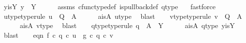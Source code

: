 \begin{isabellebody}
\ y{\isacharunderscore}{\kern0pt}is{\isacharunderscore}{\kern0pt}Y{\isacharcolon}{\kern0pt}\ {\isachardoublequoteopen}y\ {\isacharequal}{\kern0pt}\ Y{\isachardoublequoteclose}\isanewline
\ \ \ \ \isamarkupfalse%
\ assms{\isacharparenleft}{\kern0pt}{}{\isacharparenright}{\kern0pt}\ cfunc{\isacharunderscore}{\kern0pt}type{\isacharunderscore}{\kern0pt}def\ is{\isacharunderscore}{\kern0pt}pullback{\isacharunderscore}{\kern0pt}def\ q{}{\isacharunderscore}{\kern0pt}type\ \ \isamarkupfalse%
\ fastforce\isanewline
\ \ \isamarkupfalse%
\ u{\isacharunderscore}{\kern0pt}type{}{\isacharbrackleft}{\kern0pt}type{\isacharunderscore}{\kern0pt}rule{\isacharbrackright}{\kern0pt}{\isacharcolon}{\kern0pt}\ {\isachardoublequoteopen}u\ {\isacharcolon}{\kern0pt}\ Q\ {\isasymrightarrow}\ A{\isachardoublequoteclose}\isanewline
\ \ \ \ \isamarkupfalse%
\ a{\isacharunderscore}{\kern0pt}is{\isacharunderscore}{\kern0pt}A\ u{\isacharunderscore}{\kern0pt}type\ \isamarkupfalse%
\ blast\isanewline
\ \ \isamarkupfalse%
\ v{\isacharunderscore}{\kern0pt}type{}{\isacharbrackleft}{\kern0pt}type{\isacharunderscore}{\kern0pt}rule{\isacharbrackright}{\kern0pt}{\isacharcolon}{\kern0pt}\ {\isachardoublequoteopen}v\ {\isacharcolon}{\kern0pt}\ Q\ {\isasymrightarrow}\ A{\isachardoublequoteclose}\isanewline
\ \ \ \ \isamarkupfalse%
\ a{\isacharunderscore}{\kern0pt}is{\isacharunderscore}{\kern0pt}A\ v{\isacharunderscore}{\kern0pt}type\ \isamarkupfalse%
\ blast\isanewline
\ \ \isamarkupfalse%
\ q{}{\isacharunderscore}{\kern0pt}type{}{\isacharbrackleft}{\kern0pt}type{\isacharunderscore}{\kern0pt}rule{\isacharbrackright}{\kern0pt}{\isacharcolon}{\kern0pt}\ {\isachardoublequoteopen}q{}\ {\isacharcolon}{\kern0pt}\ A\ {\isasymrightarrow}\ Y{\isachardoublequoteclose}\isanewline
\ \ \ \ \isamarkupfalse%
\ a{\isacharunderscore}{\kern0pt}is{\isacharunderscore}{\kern0pt}A\ q{}{\isacharunderscore}{\kern0pt}type\ y{\isacharunderscore}{\kern0pt}is{\isacharunderscore}{\kern0pt}Y\ \isamarkupfalse%
\ blast\isanewline
\isanewline
\ \ \isamarkupfalse%
\ eqn{}{\isacharcolon}{\kern0pt}\ {\isachardoublequoteopen}f\ {\isasymcirc}\isactrlsub c\ {\isacharparenleft}{\kern0pt}q{}\ {\isasymcirc}\isactrlsub c\ u{\isacharparenright}{\kern0pt}\ {\isacharequal}{\kern0pt}\ g\ {\isasymcirc}\isactrlsub c\ {\isacharparenleft}{\kern0pt}q{}\ {\isasymcirc}\isactrlsub c\ v{\isacharparenright}{\kern0pt}{\isachardoublequoteclose}\isanewline

\end{isabellebody}
